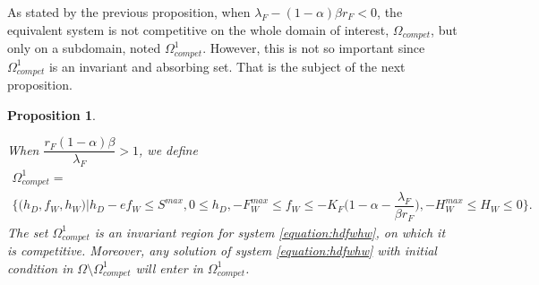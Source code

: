 \documentclass{article}
\newcommand{\lfw}{\lambda_{F}}
\newcommand{\lfw}{\lambda_{F}}
\newtheorem{prop}[theorem]{Proposition}
\theoremstyle{definition}
\theoremstyle{remark}
\begin{document}
As stated by the previous proposition, when $\lfw - (1-\alpha)\beta r_F < 0$, the equivalent system is not competitive on the whole domain of interest, $\Omega_{compet}$, but only on a subdomain, noted $\Omega_{compet}^1$. However, this is not so important since $\Omega_{compet}^1$ is an invariant and absorbing set. That is the subject of the next proposition.


\begin{prop} \label{prop:absorbing set}


When $\dfrac{r_F(1-\alpha) \beta}{\lfw} > 1$, we define 
\begin{multline*}
\Omega_{compet}^1 = \\ \Big\{\Big(h_D, f_W, h_W \Big)  \Big|h_D - ef_W \leq S^{max}, 0 \leq h_D,  -F_W^{max} \leq f_W \leq -K_F\Big(1-\alpha - \dfrac{ \lfw}{\beta r_F}\Big), -H_W^{max}\leq  H_W \leq 0 \Big\}.
\end{multline*}
The set $\Omega_{compet}^1$ is an invariant region for system \eqref{equation:hdfwhw}, on which it is competitive. Moreover, any solution of system \eqref{equation:hdfwhw} with initial condition in $\Omega \setminus \Omega_{compet}^1$ will enter in $\Omega_{compet}^1$.
\end{prop}
\end{document}
